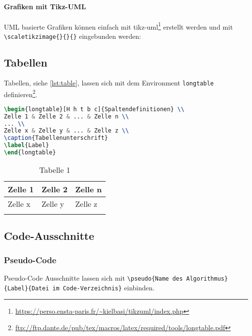 \paragraph{Grafiken mit Tikz-UML}

UML basierte Grafiken können einfach mit tikz-uml\footnote{\url{https://perso.ensta-paris.fr/~kielbasi/tikzuml/index.php}} erstellt werden und mit \lstinline|\scaletikzimage{}{}{}| eingebunden werden:

\subsection{Tabellen}
Tabellen, siehe \autoref{lst:table}, lassen sich mit dem Environment \lstinline|longtable| definieren\footnote{\url{ftp://ftp.dante.de/pub/tex/macros/latex/required/tools/longtable.pdf}}.

\begin{lstlisting}[caption=Tabelle, language=TeX, label=lst:table]
\begin{longtable}[H h t b c]{Spaltendefinitionen} \\
Zelle 1 & Zelle 2 & ... & Zelle n \\
... \\
Zelle x & Zelle y & ... & Zelle z \\
\caption{Tabellenunterschrift}
\label{Label}
\end{longtable}
\end{lstlisting}

\begin{longtable}[H]{|p{}|p{}|p{}|}
\hline
Zelle 1 & Zelle 2 & Zelle n \\
\hline
Zelle x & Zelle y & Zelle z \\
\hline
\caption{Tabelle 1}
\label{tab:tab1}
\end{longtable}

\subsection{Code-Ausschnitte}

\subsubsection{Pseudo-Code}
Pseudo-Code Ausschnitte lassen sich mit \lstinline|\pseudo{Name des Algorithmus}{Label}{Datei im Code-Verzeichnis}| einbinden.

